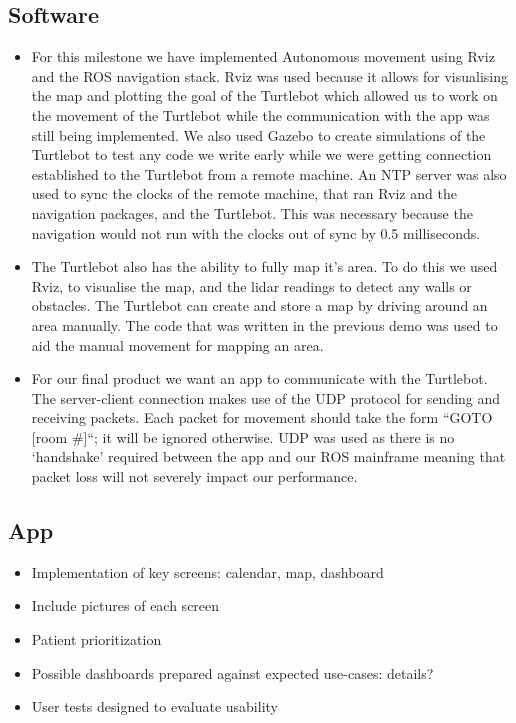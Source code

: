 \documentclass{article}
\begin{document}
\subsection{Software}
\begin{itemize}
\item For this milestone we have implemented Autonomous movement using Rviz and the ROS navigation stack. Rviz was used because it allows for visualising the map and plotting the goal of the Turtlebot which allowed us to work on the movement of the Turtlebot while the communication with the app was still being implemented. We also used Gazebo to create simulations of the Turtlebot to test any code we write early while we were getting connection established to the Turtlebot from a remote machine. An NTP server was also used to sync the clocks of the remote machine, that ran Rviz and the navigation packages, and the Turtlebot. This was necessary because the navigation would not run with the clocks out of sync by 0.5 milliseconds.
\item The Turtlebot also has the ability to fully map it's area. To do this we used Rviz, to visualise the map, and the lidar readings to detect any walls or obstacles. The Turtlebot can create and store a map by driving around an area manually. The code that was written in the previous demo was used to aid the manual movement for mapping an area.
\item For our final product we want an app to communicate with the Turtlebot.
The server-client connection makes use of the UDP protocol for sending and receiving packets. Each packet for movement should take the form “GOTO [room \#]“; it will be ignored otherwise. UDP was used as there is no ‘handshake’ required between the app and our ROS mainframe meaning that packet loss will not severely impact our performance.
\end{itemize}

\subsection{App}
\begin{itemize}
\item Implementation of key screens: calendar, map, dashboard
\item Include pictures of each screen
\item Patient prioritization
\item Possible dashboards prepared against expected use-cases: details?
\item User tests designed to evaluate usability
\end{itemize}
\end{document}
